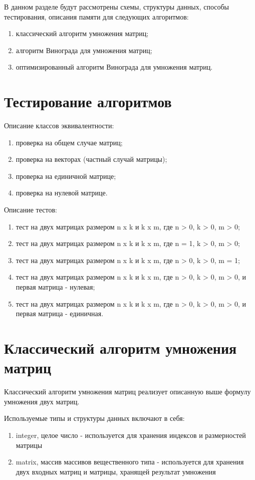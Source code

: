 В данном разделе будут рассмотрены схемы, структуры данных, способы тестирования, описания памяти для следующих алгоритмов:
\begin{enumerate}
	\item классический алгоритм умножения матриц;
	\item алгоритм Винограда для умножения матриц;
	\item оптимизированный алгоритм Винограда для умножения матриц.
\end{enumerate}

\section{Тестирование алгоритмов}

Описание классов эквивалентности:
\begin{enumerate}
	\item проверка на общем случае матриц;
	\item проверка на векторах (частный случай матрицы);
	\item проверка на единичной матрице;
	\item проверка на нулевой матрице.
\end{enumerate}

Описание тестов:
\begin{enumerate}
	\item тест на двух матрицах размером n x k и k x m, где n > 0, k >  0, m > 0;
	\item тест на двух матрицах размером n x k и k x m, где n = 1, k >  0, m > 0;
	\item тест на двух матрицах размером n x k и k x m, где n > 0, k >  0, m = 1;
	\item тест на двух матрицах размером n x k и k x m, где n > 0, k >  0, m > 0, и первая матрица - нулевая;
	\item тест на двух матрицах размером n x k и k x m, где n > 0, k >  0, m > 0, и первая матрица - единичная.
\end{enumerate}

\section{Классический алгоритм умножения матриц}

Классический алгоритм умножения матриц реализует описанную выше формулу умножения двух матриц.

Используемые типы и структуры данных включают в себя:
\begin{enumerate}
	\item integer, целое число - используется для хранения индексов и размерностей матрицы
	\item matrix, массив массивов вещественного типа - используется для хранения двух входных матриц и матрицы, хранящей результат умножения
\end{enumerate}

